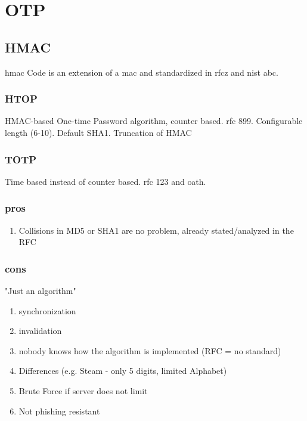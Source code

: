 \section{OTP}

\subsection{HMAC}

\gls{hmac} Code is an extension of a \gls{mac} and standardized in \gls{rfc}z and \gls{nist} abc.

\subsubsection{HTOP}

HMAC-based One-time Password algorithm, counter based. \gls{rfc} 899. Configurable length (6-10). Default SHA1. Truncation of HMAC

\subsubsection{TOTP}

Time based instead of counter based. \gls{rfc} 123 and \gls{oath}.

\subsubsection{pros}

\begin{enumerate}
	\item Collisions in MD5 or SHA1 are no problem, already stated/analyzed in the RFC
\end{enumerate}

\subsubsection{cons}

"Just an algorithm"

\begin{enumerate}
	\item synchronization
	\item invalidation
	\item nobody knows how the algorithm is implemented (RFC = no standard)
	\item Differences (e.g. Steam - only 5 digits, limited Alphabet)
	\item Brute Force if server does not limit
	\item Not phishing resistant
\end{enumerate}